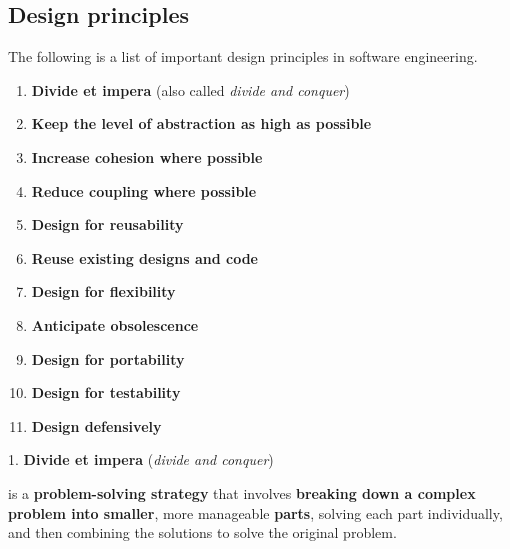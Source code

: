 \subsection{Design principles}

The following is a list of important design principles in software engineering.

\begin{definitionbox}
    \begin{enumerate}
        \item \textbf{Divide et impera} (also called \emph{divide and conquer})
        
        \item \textbf{Keep the level of abstraction as high as possible}

        \item \textbf{Increase cohesion where possible}

        \item \textbf{Reduce coupling where possible}

        \item \textbf{Design for reusability}

        \item \textbf{Reuse existing designs and code}

        \item \textbf{Design for flexibility}

        \item \textbf{Anticipate obsolescence}

        \item \textbf{Design for portability}

        \item \textbf{Design for testability}

        \item \textbf{Design defensively}
    \end{enumerate}
\end{definitionbox}

\begin{flushleft}
    \large
    \textcolor{Red3}{1. \textbf{Divide et impera} (\emph{divide and conquer})}
\end{flushleft}
 is a \textbf{problem-solving strategy} that involves \textbf{breaking down a complex problem into smaller}, more manageable \textbf{parts}, solving each part individually, and then combining the solutions to solve the original problem.

